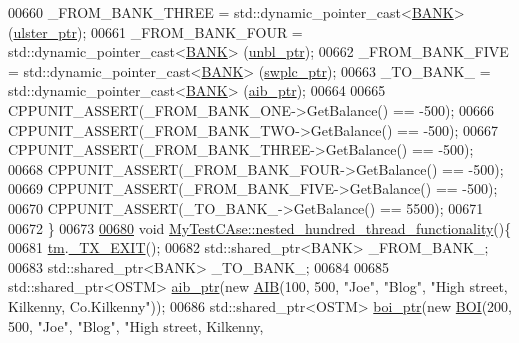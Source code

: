 \begin{DoxyCode}
00660     \_FROM\_BANK\_THREE = std::dynamic\_pointer\_cast<\hyperlink{class_b_a_n_k}{BANK}> (\hyperlink{class_my_test_c_ase_a4f9f72374d3d15be7cdf16412c4d7ed3_a4f9f72374d3d15be7cdf16412c4d7ed3}{ulster\_ptr});
00661     \_FROM\_BANK\_FOUR = std::dynamic\_pointer\_cast<\hyperlink{class_b_a_n_k}{BANK}> (\hyperlink{class_my_test_c_ase_a0ca634b597d6c0e136d632268853d5a7_a0ca634b597d6c0e136d632268853d5a7}{unbl\_ptr});
00662     \_FROM\_BANK\_FIVE = std::dynamic\_pointer\_cast<\hyperlink{class_b_a_n_k}{BANK}> (\hyperlink{class_my_test_c_ase_aa8ccae9a5a7feb5bc47591c55a82d0cd_aa8ccae9a5a7feb5bc47591c55a82d0cd}{swplc\_ptr});
00663     \_TO\_BANK\_ = std::dynamic\_pointer\_cast<\hyperlink{class_b_a_n_k}{BANK}> (\hyperlink{class_my_test_c_ase_adad50e8278b64aa0321000b528e5362c_adad50e8278b64aa0321000b528e5362c}{aib\_ptr});
00664     
00665     CPPUNIT\_ASSERT(\_FROM\_BANK\_ONE->GetBalance() == -500);
00666     CPPUNIT\_ASSERT(\_FROM\_BANK\_TWO->GetBalance() == -500);
00667     CPPUNIT\_ASSERT(\_FROM\_BANK\_THREE->GetBalance() == -500);
00668     CPPUNIT\_ASSERT(\_FROM\_BANK\_FOUR->GetBalance() == -500);
00669     CPPUNIT\_ASSERT(\_FROM\_BANK\_FIVE->GetBalance() == -500);
00670     CPPUNIT\_ASSERT(\_TO\_BANK\_->GetBalance() == 5500);
00671     
00672 \}
00673 
\hypertarget{_my_test_c_ase_8cpp_source.tex_l00680}{}\hyperlink{class_my_test_c_ase_a13635e729bf660619c7f6a75b414bc3f_a13635e729bf660619c7f6a75b414bc3f}{00680} \textcolor{keywordtype}{void} \hyperlink{class_my_test_c_ase_a13635e729bf660619c7f6a75b414bc3f_a13635e729bf660619c7f6a75b414bc3f}{MyTestCAse::nested\_hundred\_thread\_functionality}()\{
00681     \hyperlink{class_my_test_c_ase_a422e6e5d4ddedea384be96031c89b72b_a422e6e5d4ddedea384be96031c89b72b}{tm}.\hyperlink{class_t_m_a5e2d1127f2429f2f524d25f430eade06_a5e2d1127f2429f2f524d25f430eade06}{\_TX\_EXIT}();
00682     std::shared\_ptr<BANK> \_FROM\_BANK\_;
00683     std::shared\_ptr<BANK> \_TO\_BANK\_;
00684     
00685     std::shared\_ptr<OSTM> \hyperlink{class_my_test_c_ase_adad50e8278b64aa0321000b528e5362c_adad50e8278b64aa0321000b528e5362c}{aib\_ptr}(\textcolor{keyword}{new} \hyperlink{class_a_i_b}{AIB}(100, 500, \textcolor{stringliteral}{"Joe"}, \textcolor{stringliteral}{"Blog"}, \textcolor{stringliteral}{"High street, Kilkenny,
       Co.Kilkenny"}));
00686     std::shared\_ptr<OSTM> \hyperlink{class_my_test_c_ase_a5554de9e3e6393a89c66c036c529720b_a5554de9e3e6393a89c66c036c529720b}{boi\_ptr}(\textcolor{keyword}{new} \hyperlink{class_b_o_i}{BOI}(200, 500, \textcolor{stringliteral}{"Joe"}, \textcolor{stringliteral}{"Blog"}, \textcolor{stringliteral}{"High street, Kilkenny,
}
\end{DoxyCode}
